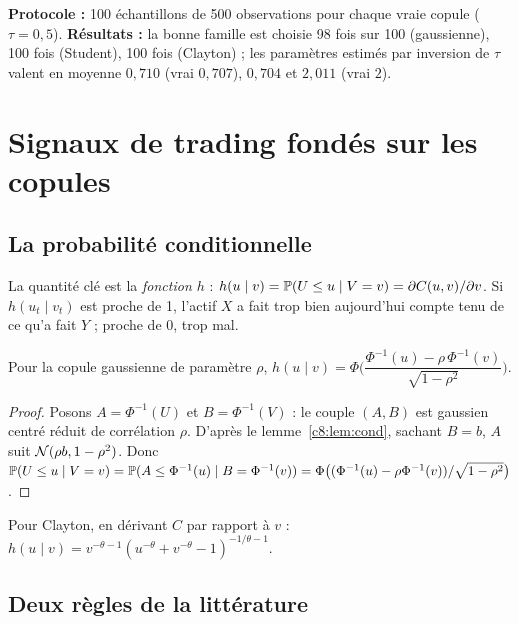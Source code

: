 \begin{codebox}
\textbf{Protocole :} 100 échantillons de 500 observations pour chaque vraie copule ($\tau = 0{,}5$). \textbf{Résultats :} la bonne famille est choisie 98 fois sur 100 (gaussienne), 100 fois (Student), 100 fois (Clayton) ; les paramètres estimés par inversion de $\tau$ valent en moyenne $0{,}710$ (vrai $0{,}707$), $0{,}704$ et $2{,}011$ (vrai $2$).
\end{codebox}

\section{Signaux de trading fondés sur les copules}

\subsection{La probabilité conditionnelle}

La quantité clé est la \emph{fonction $h$} : $h(u\mid v) = \mathbb{P}(U\le u\mid V = v) = \partial C(u,v)/\partial v$. Si $h(u_t\mid v_t)$ est proche de 1, l'actif $X$ a fait \og trop bien\fg{} aujourd'hui compte tenu de ce qu'a fait $Y$ ; proche de 0, trop mal.

\begin{proposition}\label{c9:prop:hgauss}
Pour la copule gaussienne de paramètre $\rho$, $h(u\mid v) = \Phi\Big(\dfrac{\Phi^{-1}(u) - \rho\,\Phi^{-1}(v)}{\sqrt{1-\rho^2}}\Big)$.
\end{proposition}
\begin{proof}
Posons $A = \Phi^{-1}(U)$ et $B = \Phi^{-1}(V)$ : le couple $(A,B)$ est gaussien centré réduit de corrélation $\rho$. D'après le lemme~\ref{c8:lem:cond}, sachant $B = b$, $A$ suit $\mathcal{N}(\rho b, 1-\rho^2)$. Donc $\mathbb{P}(U\le u\mid V=v) = \mathbb{P}(A\le\Phi^{-1}(u)\mid B = \Phi^{-1}(v)) = \Phi\big((\Phi^{-1}(u)-\rho\Phi^{-1}(v))/\sqrt{1-\rho^2}\big)$.
\end{proof}

Pour Clayton, en dérivant $C$ par rapport à $v$ : $h(u\mid v) = v^{-\theta-1}(u^{-\theta}+v^{-\theta}-1)^{-1/\theta-1}$.

\subsection{Deux règles de la littérature}

